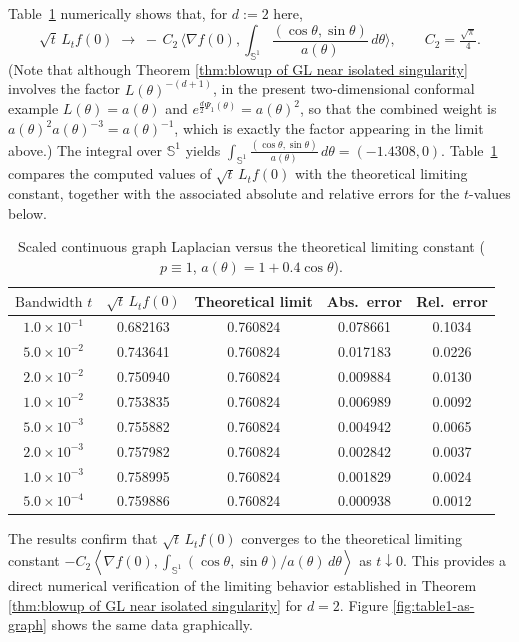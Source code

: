 \documentclass{amsart}
\theoremstyle{definition}
\theoremstyle{remark}
\newcommand{\nd}{\noindent}
\newcommand{\0}{\boldsymbol{0}}
\begin{document}
Table~\ref{tab:scaled_GL} numerically shows that, for $d:=2$ here,
\[
\sqrt{t}\,L_t f(0)
\;\longrightarrow\;
-\,C_2\,\Big\langle \nabla f(0),
\int_{\mathbb{S}^1}\frac{(\cos \theta,\sin \theta)}{a(\theta)}\,d\theta \Big\rangle,
\qquad C_2 = \tfrac{\sqrt{\pi}}{4}.
\]
(Note that although Theorem \ref{thm:blowup of GL near isolated singularity} involves the factor $L(\theta)^{-(d+1)}$, in the present two-dimensional conformal example $L(\theta)=a(\theta)$ and $e^{\frac d2\Psi_1(\theta)}=a(\theta)^2$, so that the combined weight is $a(\theta)^2 a(\theta)^{-3}=a(\theta)^{-1}$, which is exactly the factor appearing in the limit above.)
The integral over $\mathbb{S}^1$ yields
$\displaystyle \int_{\mathbb{S}^1}\frac{(\cos \theta,\sin \theta)}{a(\theta)}\,d\theta = (-1.4308,0)$.
Table~\ref{tab:scaled_GL} compares the computed values of $\sqrt{t}\,L_t f(0)$ with the theoretical limiting constant, together with the associated absolute and relative errors for the $t$-values below.

\begin{table}[h!]
\centering
\caption{Scaled continuous graph Laplacian versus the theoretical limiting constant
($p\equiv1$, $a(\theta)=1+0.4\cos\theta$).}
\label{tab:scaled_GL}
\begin{tabular}{ccccc}
\toprule
$\text{Bandwidth }t$ & $\sqrt{t}\,L_t f(0)$ & Theoretical limit & Abs.\ error & Rel.\ error \\
\midrule
$1.0\times10^{-1}$ & 0.682163 & 0.760824 & 0.078661 & 0.1034 \\
$5.0\times10^{-2}$ & 0.743641 & 0.760824 & 0.017183 & 0.0226 \\
$2.0\times10^{-2}$ & 0.750940 & 0.760824 & 0.009884 & 0.0130 \\
$1.0\times10^{-2}$ & 0.753835 & 0.760824 & 0.006989 & 0.0092 \\
$5.0\times10^{-3}$ & 0.755882 & 0.760824 & 0.004942 & 0.0065 \\
$2.0\times10^{-3}$ & 0.757982 & 0.760824 & 0.002842 & 0.0037 \\
$1.0\times10^{-3}$ & 0.758995 & 0.760824 & 0.001829 & 0.0024 \\
$5.0\times10^{-4}$ & 0.759886 & 0.760824 & 0.000938 & 0.0012 \\
\bottomrule
\end{tabular}
\end{table}

\nd The results confirm that $\sqrt{t}\,L_t f(0)$ converges to the theoretical limiting constant
$-C_2\left\langle\nabla f(0),
\int_{\mathbb{S}^1}(\cos \theta,\sin \theta)/a(\theta)\,d\theta\right\rangle$ as $t\downarrow0$.
This provides a direct numerical verification of the limiting behavior established in Theorem \ref{thm:blowup of GL near isolated singularity} for $d=2.$ Figure \ref{fig:table1-as-graph}
shows the same data graphically.
\end{document}

